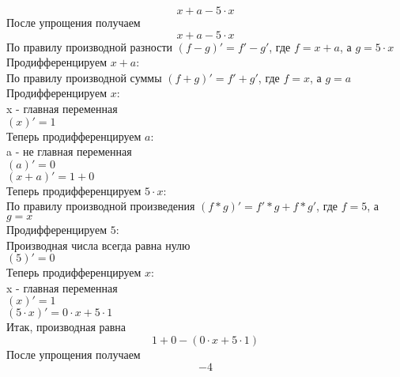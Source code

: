 \documentclass[12pt]{article}
\begin{document}
  $$x + a - 5 \cdot x$$
После упрощения получаем
    $$x + a - 5 \cdot x$$
По правилу производной разности $\left(f - g\right)' = f' - g'$, где $f = x + a$, а $g = 5 \cdot x$\\
Продифференцируем $x + a$:\\По правилу производной суммы $\left(f + g\right)' = f' + g'$, где $f = x$, а $g = a$\\
Продифференцируем $x$:\\x - главная переменная\\$\left(x\right)' = 1$\\
Теперь продифференцируем $a$:\\a - не главная переменная\\$\left(a\right)' = 0$\\$\left(x + a\right)' = 1 + 0$\\
Теперь продифференцируем $5 \cdot x$:\\По правилу производной произведения $\left(f * g\right)' = f' * g + f * g'$, где $f = 5$, а $g = x$\\
Продифференцируем $5$:\\Производная числа всегда равна нулю\\$\left(5\right)' = 0$\\
Теперь продифференцируем $x$:\\x - главная переменная\\$\left(x\right)' = 1$\\$\left(5 \cdot x\right)' = 0 \cdot x + 5 \cdot 1$\\Итак, производная равна
    $$1 + 0 - \left(0 \cdot x + 5 \cdot 1\right)$$
После упрощения получаем
    $$-4$$
\end{document}
